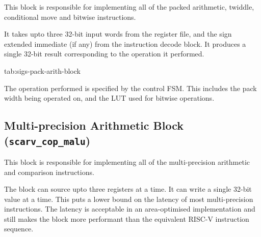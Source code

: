 \documentclass{article}
\begin{document}
This block is responsible for implementing all of the packed arithmetic,
twiddle, conditional move and bitwise instructions.

It takes upto three 32-bit input words from the register file, and the sign
extended immediate (if any) from the instruction decode block.
It produces a single 32-bit result corresponding to the operation it
performed.

{tab:sigs-pack-arith-block}

The operation performed is specified by the control FSM.
This includes the pack width being operated on, and the LUT used for bitwise
operations.

\subsection{Multi-precision Arithmetic Block ({\tt scarv\_cop\_malu})}

This block is responsible for implementing all of the multi-precision
arithmetic and comparison instructions.

The block can source upto three registers at a time.
It can write a single 32-bit value at a time.
This puts a lower bound on the latency of most multi-precision instructions.
The latency is acceptable in an area-optimised implementation and still
makes the block more performant than the equivalent RISC-V instruction
sequence.
\end{document}
